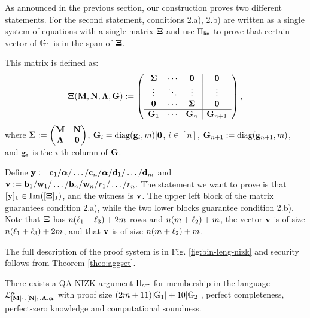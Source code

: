 As announced in the previous section, our construction proves two different statements. For the second statement, conditions 2.a), 2.b) are written as a single system of equations with a single matrix $\mathbf{{\Xi}}$ and use $\Pi_{\mathsf{lin}}$ to prove that certain vector of $\mathbb{G}_1$ is in the span of $\mathbf{{\Xi}}$.

This matrix is defined as:
$$\mathbf{{\Xi}}(\mathbf{{M}},\mathbf{{N}},\mathbf{{\Lambda}},\mathbf{{G}}):=
\left(\begin{array}{ccc|ccc}
\mathbf{{\Sigma}}             & \cdots & \mathbf{{0}}                  & \mathbf{{0}} \\
\vdots                    & \ddots & \vdots                    & \vdots   \\
\mathbf{{0}}                  & \cdots & \mathbf{{\Sigma}}             & \mathbf{{0}} \\
\hline
\mathbf{{G}}_1 & \cdots & \mathbf{{G}}_n & \mathbf{{G}}_{n+1}
\end{array}\right),
$$ where $\mathbf{{\Sigma}}:=\begin{pmatrix}
    \mathbf{{M}}       & \mathbf{{N}}\\
    \mathbf{{\Lambda}} & \mathbf{{0}}
\end{pmatrix}$,
 $\mathbf{{G}}_i=\mathrm{diag}(\mathbf{g}_i,{m})|\mathbf{0}$, $i\in[n]$, $\mathbf{{G}}_{n+1}:=\mathrm{diag}(\mathbf{g}_{n+1},{m})$, and $\mathbf{g}_i$ is the $i$ th column of $\mathbf{{G}}$. 
 
Define $\mathbf{y}:=\mathbf{c}_1/ {\boldsymbol \alpha}
/ \ldots / \mathbf{c}_n/ {\boldsymbol \alpha} 
/ \mathbf{d}_1 /  \ldots /  \mathbf{d}_m$
and 
 $\mathbf{v}:=\mathbf{b}_1/ \mathbf{w}_1 / \ldots / \mathbf{b}_n/ \mathbf{w}_n / r_1 / \ldots / r_n.$ The statement we want to prove is that $[\mathbf{y}]_1 \in \mathbf{Im}([\mathbf{{\Xi}}]_1)$, and the witness is $\mathbf{v}$. The upper left block of the matrix guarantees condition 2.a), while the two lower blocks guarantee 
condition 2.b).
Note that $\mathbf{{\Xi}}$ has $n({\ell_1}+{\ell_3})+2{m}$ rows and $n({m}+{\ell_2})+m$, the vector $\mathbf{v}$ is of size $n({\ell_1}+{\ell_3})+2{m}$, and that $\mathbf{v}$ is of size $n({m}+{\ell_2})+m$.

The full description of the proof system is in Fig. \ref{fig:bin-leng-nizk} and security follows from Theorem \ref{theo:aggset}.


\begin{theorem} \label{theo:aggset} There exists a QA-NIZK argument $\Pi_{\mathsf{set}}$ for membership in the language $\mathcal{L}_{[\mathbf{{M}}]_1,[\mathbf{{N}}]_1,\mathbf{{\Lambda}},{\boldsymbol \alpha}}^n$ with proof size  $(2{m}+11)|\mathbb{G}_1|+10|\mathbb{G}_2|$, perfect completeness, perfect-zero knowledge and computational soundness. 
\end{theorem}

